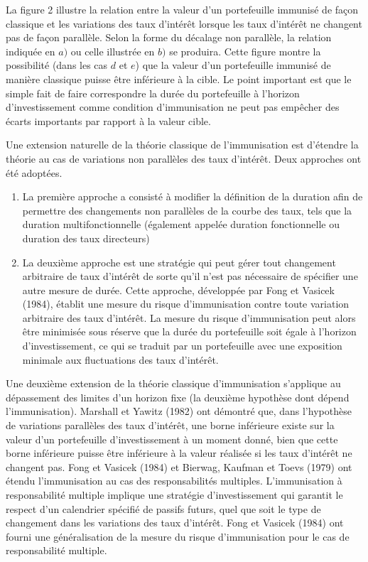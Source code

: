 \documentclass[12pt]{article}
\begin{document}
\vspace{0.5cm}


La figure 2 illustre la relation entre la valeur d'un portefeuille immunisé de façon classique et les variations des taux d'intérêt lorsque les taux d'intérêt ne changent pas de façon parallèle.  Selon la forme du décalage non parallèle, la relation indiquée en $a)$ ou celle illustrée en $b)$ se produira. Cette figure montre la possibilité (dans les cas $d$ et $e$) que la valeur d'un portefeuille immunisé de manière classique puisse être inférieure à la cible. Le point important est que le simple fait de faire correspondre la durée du portefeuille à l'horizon d'investissement comme condition d'immunisation ne peut pas empêcher des écarts importants par rapport à la valeur cible.

\vspace{0.5cm}

Une extension naturelle de la théorie classique de l'immunisation est d'étendre la théorie au cas de variations non parallèles des taux d'intérêt. Deux approches ont été adoptées.

\begin{enumerate}
\item La première approche a consisté à modifier la définition de la duration afin de permettre des changements non parallèles de la courbe des taux, tels que la duration multifonctionnelle (également appelée duration fonctionnelle ou duration des taux directeurs)
\item La deuxième approche est une stratégie qui peut gérer tout changement arbitraire de taux d'intérêt de sorte qu'il n'est pas nécessaire de spécifier une autre mesure de durée. Cette approche, développée par Fong et Vasicek (1984), établit une mesure du risque d'immunisation contre toute variation arbitraire des taux d'intérêt. La mesure du risque d'immunisation peut alors être minimisée sous réserve que la durée du portefeuille soit égale à l'horizon d'investissement, ce qui se traduit par un portefeuille avec une exposition minimale aux fluctuations des taux d'intérêt.
\end{enumerate}

\vspace{0.5cm}

Une deuxième extension de la théorie classique d'immunisation s'applique au dépassement des limites d'un horizon fixe (la deuxième hypothèse dont dépend l'immunisation). Marshall et Yawitz (1982) ont démontré que, dans l'hypothèse de variations parallèles des taux d'intérêt, une borne inférieure existe sur la valeur d'un portefeuille d'investissement à un moment donné, bien que cette borne inférieure puisse être inférieure à la valeur réalisée si les taux d'intérêt ne changent pas. Fong et Vasicek (1984) et Bierwag, Kaufman et Toevs (1979) ont étendu l'immunisation au cas des responsabilités multiples. L'immunisation à responsabilité multiple implique une stratégie d'investissement qui garantit le respect d'un calendrier spécifié de passifs futurs, quel que soit le type de changement dans les variations des taux d'intérêt. Fong et Vasicek (1984) ont fourni une généralisation de la mesure du risque d'immunisation pour le cas de responsabilité multiple.
\end{document}

